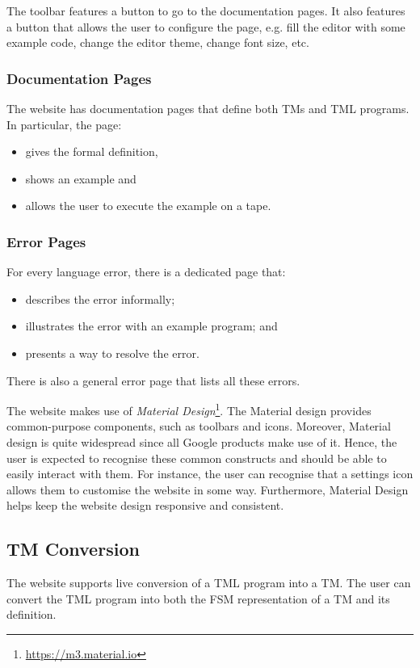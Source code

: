 The toolbar features a button to go to the documentation pages. It also features a button that allows the user to configure the page, e.g. fill the editor with some example code, change the editor theme, change font size, etc. 

\subsubsection{Documentation Pages}
The website has documentation pages that define both TMs and TML programs. In particular, the page:
\begin{itemize}
    \item gives the formal definition, 
    \item shows an example and 
    \item allows the user to execute the example on a tape.
\end{itemize}

\subsubsection{Error Pages}
For every language error, there is a dedicated page that:
\begin{itemize}
    \item describes the error informally;
    \item illustrates the error with an example program; and 
    \item presents a way to resolve the error.
\end{itemize}
There is also a general error page that lists all these errors.

The website makes use of \emph{Material Design}\footnote{\url{https://m3.material.io}}. The Material design provides common-purpose components, such as toolbars and icons. Moreover, Material design is quite widespread since all Google products make use of it. Hence, the user is expected to recognise these common constructs and should be able to easily interact with them. For instance, the user can recognise that a settings icon allows them to customise the website in some way. Furthermore, Material Design helps keep the website design responsive and consistent.

\subsection{TM Conversion}
The website supports live conversion of a TML program into a TM. The user can convert the TML program into both the FSM representation of a TM and its definition.

